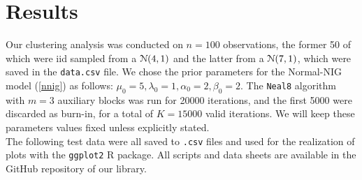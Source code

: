 \chapter{Results}
Our clustering analysis was conducted on $n=100$ observations, the former 50 of which were iid sampled from a $\mathcal N(4,1)$ and the latter from a $\mathcal N(7,1)$, which were saved in the \verb|data.csv| file.
We chose the prior parameters for the Normal-NIG model (\ref{nnig}) as follows: $\mu_0 = 5, \lambda_0 = 1, \alpha_0 = 2, \beta_0 = 2$.
The \verb|Neal8| algorithm with $m=3$ auxiliary blocks was run for 20000 iterations, and the first 5000 were discarded as burn-in, for a total of $K=15000$ valid iterations.
We will keep these parameters values fixed unless explicitly stated. \\
The following test data were all saved to \verb|.csv| files and used for the realization of plots with the \verb|ggplot2| R package.
All scripts and data sheets are available in the GitHub repository of our library.

